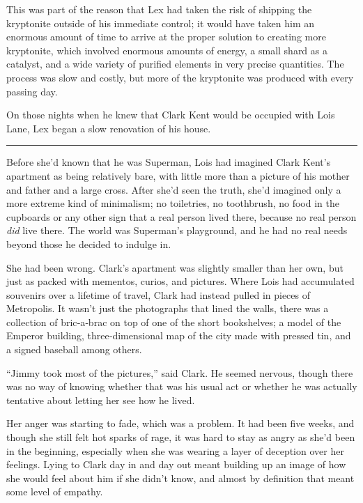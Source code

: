 This was part of the reason that Lex had taken the risk of shipping the
kryptonite outside of his immediate control; it would have taken him an
enormous amount of time to arrive at the proper solution to creating
more kryptonite, which involved enormous amounts of energy, a small
shard as a catalyst, and a wide variety of purified elements in very
precise quantities. The process was slow and costly, but more of the
kryptonite was produced with every passing day.

On those nights when he knew that Clark Kent would be occupied with Lois
Lane, Lex began a slow renovation of his house.

\begin{center}\rule{0.5\linewidth}{0.5pt}\end{center}

Before she'd known that he was Superman, Lois had imagined Clark Kent's
apartment as being relatively bare, with little more than a picture of
his mother and father and a large cross. After she'd seen the truth,
she'd imagined only a more extreme kind of minimalism; no toiletries, no
toothbrush, no food in the cupboards or any other sign that a real
person lived there, because no real person \emph{did} live there. The
world was Superman's playground, and he had no real needs beyond those
he decided to indulge in.

She had been wrong. Clark's apartment was slightly smaller than her own,
but just as packed with mementos, curios, and pictures. Where Lois had
accumulated souvenirs over a lifetime of travel, Clark had instead
pulled in pieces of Metropolis. It wasn't just the photographs that
lined the walls, there was a collection of bric‐a‐brac on top of one of
the short bookshelves; a model of the Emperor building,
three‐dimensional map of the city made with pressed tin, and a signed
baseball among others.

``Jimmy took most of the pictures,'' said Clark. He seemed nervous,
though there was no way of knowing whether that was his usual act or
whether he was actually tentative about letting her see how he lived.

Her anger was starting to fade, which was a problem. It had been five
weeks, and though she still felt hot sparks of rage, it was hard to stay
as angry as she'd been in the beginning, especially when she was wearing
a layer of deception over her feelings. Lying to Clark day in and day
out meant building up an image of how she would feel about him if she
didn't know, and almost by definition that meant some level of empathy.

